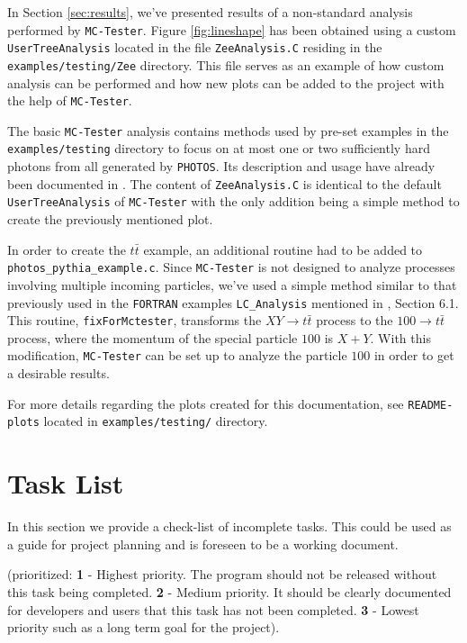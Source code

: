 \documentclass[]{Photos_interface_design}
\begin{document}
In Section \ref{sec:results}, we've presented results of a non-standard
analysis performed by {\tt MC-Tester}. Figure \ref{fig:lineshape} has been
obtained using a custom {\tt UserTreeAnalysis} located in the file {\tt ZeeAnalysis.C}
residing in the {\tt examples/testing/Zee} directory. This file serves as an
example of how custom analysis can be performed and how new plots can be
added to the project with the help of {\tt MC-Tester}.

The basic {\tt MC-Tester} analysis contains methods used by pre-set examples
in the {\tt examples/testing} directory to focus on at most one or two 
sufficiently hard photons from all generated
by {\tt PHOTOS}. Its description and usage have already been documented in \cite{Davidson:2008ma}.
The content of {\tt ZeeAnalysis.C} is identical to the default {\tt UserTreeAnalysis}
of {\tt MC-Tester} with the only addition being a simple method to create
the previously mentioned plot.

In order to create the $t \bar t$ example, an additional routine had to be added to {\tt photos\_pythia\_example.c}.
Since {\tt MC-Tester} is not designed to analyze processes involving
multiple incoming particles, we've used a simple method similar to that previously
used in the {\tt FORTRAN} examples {\tt LC\_Analysis} mentioned in \cite{Golonka:2002rz}, Section 6.1.
This routine, {\tt fixForMctester}, transforms the $X Y \rightarrow t \bar t$
process to the $100 \rightarrow t \bar t$ process,
where the momentum of the
special particle $100$ is $X + Y$. With this modification, {\tt MC-Tester} can be set
up to analyze the particle $100$ in order to get a desirable results.

For more details regarding the plots created for this documentation, see
{\tt README-plots} located in {\tt examples/testing/} directory.

\newpage

\section*{Task List}
In this section we provide a check-list of incomplete tasks.
This could be used as a guide for project planning and is foreseen
to be a working document. 

(prioritized: {\bf 1} - Highest priority. The program should not be
released without this task being completed. {\bf 2} - Medium priority.
It should be clearly documented for developers and users that this task has not
been completed. {\bf 3} - Lowest priority such as a long term goal 
for the project).
\end{document}
